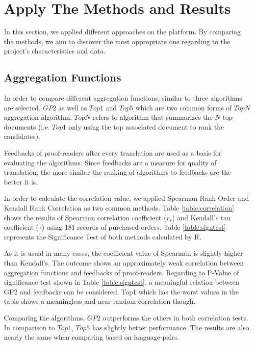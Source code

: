 \section{Apply The Methods and Results}
\label{sec:apply}
In this section, we applied different approaches on the platform. By comparing the methods, we aim to discover the most appropriate one regarding to the project's characteristics and data.

\subsection{Aggregation Functions}
In order to compare different aggregation functions, similar to \citet{agg-gp2} three algorithms are selected. $GP2$ as well as $Top1$ and $Top5$ which are two common forms of $TopN$ aggregation algorithm. $TopN$ refers to algorithm that summarizes the $N$ top documents (i.e. $Top1$ only using the top associated document to rank the candidates).

Feedbacks of proof-readers after every translation are used as a basis for evaluating the algorithms. Since feedbacks are a measure for quality of translation, the more similar the ranking of algorithms to feedbacks are the better it is. 

In order to calculate the correlation value, we applied Spearman Rank Order and Kendall Rank Correlation as two common methods. Table \ref{table:correlation} shows the results of Spearman correlation coefficient ($r_s$) and Kendall's tau coefficient ($\tau$) using $181$ records of purchased orders. Table \ref{table:signtest} represents the Significance Test of both methods calculated by R.

As it is usual in many cases, the coefficient value of Spearman is slightly higher than Kendall's. The outcome shows an approximately weak correlation between aggregation functions and feedbacks of proof-readers. Regarding to P-Value of significance test shown in Table \ref{table:signtest}, a meaningful relation between GP2 and feedbacks can be considered. Top1 which has the worst values in the table shows a meaningless and near random correlation though.

Comparing the algorithms, $GP2$ outperforms the others in both correlation tests. In comparison to $Top1$, $Top5$ has slightly better performance. The results are also nearly the same when comparing based on language-pairs.

\begin{table}
\begin{center}
\caption{Correlation Test Between Algorithms and Proof-readers' Feedbacks}
\label{table:correlation}
\end{center}
\end{table}

